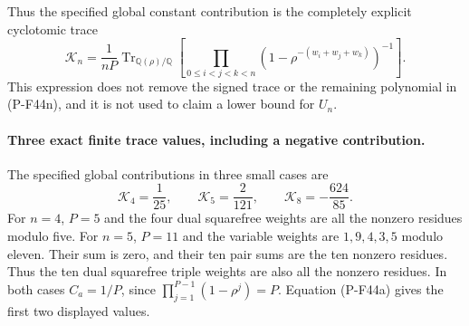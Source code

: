 \documentclass[11pt,a4paper]{article}
\begin{document}
Thus the specified global constant contribution is
the completely explicit cyclotomic trace
\[
 \mathcal K_n=\frac1{nP}
 \operatorname{Tr}_{\mathbb Q(\rho)/\mathbb Q}
 \left[
   \prod_{0\le i<j<k<n}
          (1-\rho^{-(w_i+w_j+w_k)})^{-1}
 \right].
 \tag{P-F44t}
\]
This expression does not remove the signed trace or the
remaining polynomial in (P-F44n), and it is not used to
claim a lower bound for $U_n$.

\paragraph{Three exact finite trace values, including a negative contribution.}
The specified global contributions in three small cases are
\[
              \mathcal K_4=\frac1{25},\qquad
              \mathcal K_5=\frac2{121},\qquad
              \mathcal K_8=-\frac{624}{85}.
 \tag{P-F44u}
\]
For $n=4$, $P=5$ and the four dual squarefree weights
are all the nonzero residues modulo five.
For $n=5$, $P=11$ and the variable weights are
$1,9,4,3,5$ modulo eleven. Their sum is zero, and their
ten pair sums are the ten nonzero residues. Thus the
ten dual squarefree triple weights are also all the
nonzero residues. In both cases
$C_a=1/P$, since
$\prod_{j=1}^{P-1}(1-\rho^j)=P$.
Equation (P-F44a) gives the first two displayed values.
\end{document}
